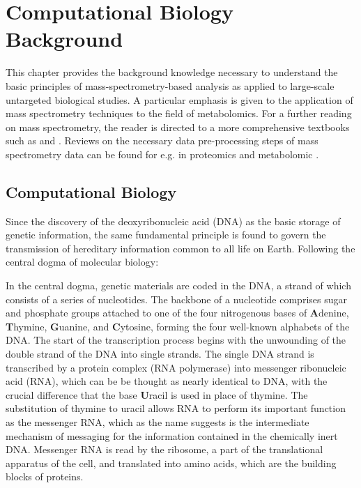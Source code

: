 \chapter{Computational Biology Background}
\label{c:background}


This chapter provides the background knowledge necessary to understand the basic principles of mass-spectrometry-based analysis as applied to large-scale untargeted biological studies. A particular emphasis is given to the application of mass spectrometry techniques to the field of metabolomics. For a further reading on mass spectrometry, the reader is directed to a more comprehensive textbooks such as \cite{Hoffmann2007} and \cite{gross2006mass}. Reviews on the necessary data pre-processing steps of mass spectrometry data can be found for e.g. in proteomics \cite{Megger2013, Sandin2014, Smith2014} and metabolomic \cite{Castillo2011,Manuscript2013,Gika2014}.

\section{Computational Biology}

Since the discovery of the deoxyribonucleic acid (DNA) as the basic storage of genetic information, the same fundamental principle is found to govern the transmission of hereditary information common to all life on Earth. Following the central dogma of molecular biology:
\begin{center}\end{center}
In the central dogma, genetic materials are coded in the DNA, a strand of which consists of a series of nucleotides. The backbone of a nucleotide comprises sugar and phosphate groups attached to one of the four nitrogenous bases of \textbf{A}denine, \textbf{T}hymine, \textbf{G}uanine, and \textbf{C}ytosine, forming the four well-known alphabets of the DNA. The start of the transcription process begins with the unwounding of the double strand of the DNA into single strands. The single DNA strand is transcribed by a protein complex (RNA polymerase) into messenger ribonucleic acid (RNA), which can be be thought as nearly identical to DNA, with the crucial difference that the base \textbf{U}racil is used in place of thymine. The substitution of thymine to uracil allows RNA to perform its important function as the messenger RNA, which as the name suggests is the intermediate mechanism of messaging for the information contained in the chemically inert DNA. Messenger RNA is read by the ribosome, a part of the translational apparatus of the cell, and translated into amino acids, which are the building blocks of proteins. 

